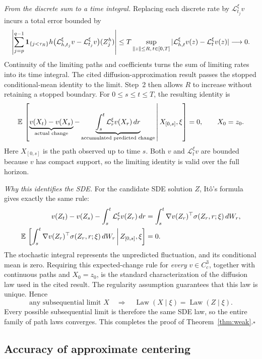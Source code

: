 \emph{From the discrete sum to a time integral.}
Replacing each discrete rate by $\mathcal L_{t_j}^{\xi}v$ incurs a total error bounded by
\[
 \left|\sum_{j=p}^{q-1}\boldsymbol 1_{\{j<\tau_R\}}h
  \bigl(\mathcal L_{h,t_j}^{\xi}v-\mathcal L_{t_j}^{\xi}v\bigr)(Z_j^h)\right|
 \leq T\sup_{\left\lVert z\right\rVert\leq R,\,t\in[0,T]}
       |\mathcal L_{h,t}^{\xi}v(z)-\mathcal L_t^{\xi}v(z)|
 \longrightarrow0.
\]
Continuity of the limiting paths and coefficients turns the sum of limiting rates into its time integral. The cited diffusion-approximation result passes the stopped conditional-mean identity to the limit. Step~2 then allows $R$ to increase without retaining a stopped boundary. For $0\leq s\leq t\leq T$, the resulting identity is
\begin{equation}\label{eq:limit-expected-change}
 \mathbb E\,\left[
 \underbrace{v(X_t)-v(X_s)}_{\mbox{\scriptsize actual change}}
 -\underbrace{\int_s^t\mathcal L_r^\xi v(X_r)\,dr}_{\mbox{\scriptsize accumulated predicted change}}
 \,\middle|\,X_{[0,s]},\xi\right]=0,
 \qquad X_0=z_0.
\end{equation}
Here $X_{[0,s]}$ is the path observed up to time $s$. Both $v$ and $\mathcal L_t^\xi v$ are bounded because $v$ has compact support, so the limiting identity is valid over the full horizon.

\emph{Why this identifies the SDE.}
For the candidate SDE solution $Z$, It\^o's formula gives exactly the same rule:
\begin{align}\label{eq:ito-expected-change}
 v(Z_t)-v(Z_s)-\int_s^t\mathcal L_r^\xi v(Z_r)\,dr
 &=\int_s^t\nabla v(Z_r)^\top\sigma(Z_r,r;\xi)\,dW_r,\notag\\
 \mathbb E\,\left[\int_s^t\nabla v(Z_r)^\top\sigma(Z_r,r;\xi)\,dW_r
       \,\middle|\,Z_{[0,s]},\xi\right]&=0.
\end{align}
The stochastic integral represents the unpredicted fluctuation, and its conditional mean is zero. Requiring this expected-change rule for \emph{every} $v\in C_c^3$, together with continuous paths and $X_0=z_0$, is the standard characterization of the diffusion law used in the cited result. The regularity assumption guarantees that this law is unique. Hence
\[
 \mbox{any subsequential limit }X
 \quad\Longrightarrow\quad
 \operatorname{Law}(X\mid\xi)=\operatorname{Law}(Z\mid\xi).
\]
Every possible subsequential limit is therefore the same SDE law, so the entire family of path laws converges. This completes the proof of Theorem~\ref{thm:weak}.\hfill$\square$

\subsection{Accuracy of approximate centering}

